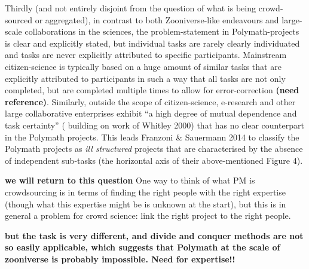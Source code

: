 \documentclass[article, floatfix, groupaddress, prb]{revtex4-1}
\begin{document}
Thirdly (and not entirely disjoint from the question of what is being
crowd-sourced or aggregated), in contrast to both Zooniverse-like
endeavours and large-scale collaborations in the sciences, the
problem-statement in Polymath-projects is clear and explicitly stated,
but individual tasks are rarely clearly individuated and tasks are never
explicitly attributed to specific participants. Mainstream
citizen-science is typically based on a huge amount of similar tasks
that are explicitly attributed to participants in such a way that all
tasks are not only completed, but are completed multiple times to allow
for error-correction \textbf{(need reference)}. Similarly, outside the
scope of citizen-science, e-research and other large collaborative
enterprises exhibit ``a high degree of mutual dependence and task
certainty'' (\cite{meyer2015knowledge} building on work of Whitley 2000)
that has no clear counterpart in the Polymath projects. This leads
Franzoni \& Sauermann 2014 to classify the Polymath projects as
\emph{ill structured} projects that are characterised by the absence of
independent sub-tasks (the horizontal axis of their above-mentioned
Figure 4).

    \textbf{we will return to this question} One way to think of what PM is
crowdsourcing is in terms of finding the right people with the right
expertise (though what this expertise might be is unknown at the start),
but this is in general a problem for crowd science: link the right
project to the right people.

\textbf{but the task is very different, and divide and conquer methods
are not so easily applicable, which suggests that Polymath at the scale
of zooniverse is probably impossible. Need for expertise!!}
\end{document}
